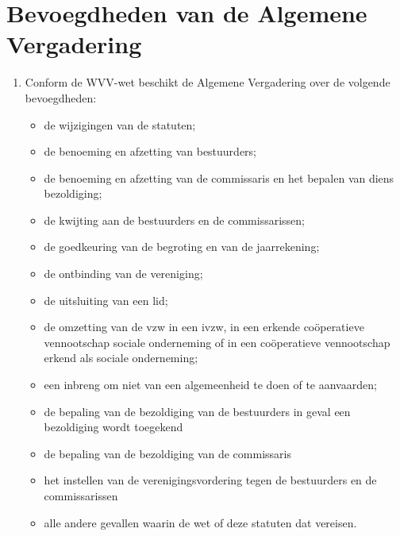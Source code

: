     \section{Bevoegdheden van de Algemene Vergadering}
    \begin{enumerate}
    \item Conform de WVV-wet beschikt de Algemene Vergadering over de volgende bevoegdheden:
        \begin{itemize}
        \item de wijzigingen van de statuten;
        \item de benoeming en afzetting van bestuurders;
        \item de benoeming en afzetting van de commissaris en het bepalen van diens bezoldiging;
        \item de kwijting aan de bestuurders en de commissarissen;
        \item de goedkeuring van de begroting en van de jaarrekening;
        \item de ontbinding van de vereniging;
        \item de uitsluiting van een lid;
        \item de omzetting van de vzw in een ivzw, in een erkende coöperatieve vennootschap sociale onderneming of in een coöperatieve vennootschap erkend als sociale onderneming;
        \item een inbreng om niet van een algemeenheid te doen of te aanvaarden;
        \item de bepaling van de bezoldiging van de bestuurders in geval een bezoldiging wordt toegekend
        \item de bepaling van de bezoldiging van de commissaris
        \item het instellen van de verenigingsvordering tegen de bestuurders en de commissarissen
        \item alle andere gevallen waarin de wet of deze statuten dat vereisen.
        \end{itemize}
    \end{enumerate}
    
